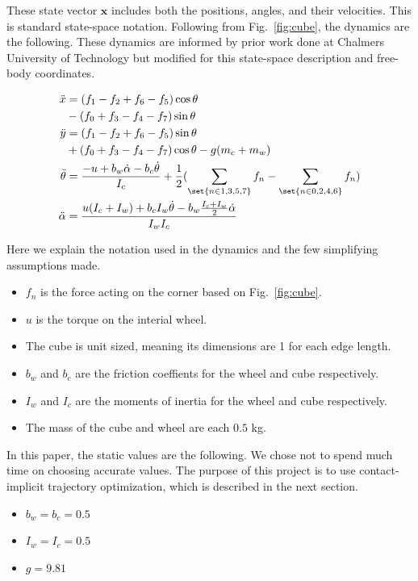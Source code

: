 \documentclass[conference]{IEEEtran}
\begin{document}
These state vector $\textbf{x}$ includes both the positions, angles, and their velocities. This is standard state-space notation. Following from Fig.~\ref{fig:cube}, the dynamics are the following. These dynamics are informed by prior work done at Chalmers University of Technology \cite{b4} but modified for this state-space description and free-body coordinates.

\begin{align}
\ddot x &= (f_{1}-f_{2}+f_{6}-f_{5})\cos{\theta} \\
&- (f_{0}+f_{3}-f_{4}-f_{7})\sin{\theta} \\
\ddot y &= (f_{1}-f_{2}+f_{6}-f_{5})\sin{\theta} \\
&+ (f_{0}+f_{3}-f_{4}-f_{7})\cos{\theta}-g(m_{c}+m_{w}) \\
\ddot \theta &= \frac{-u + b_{w}\dot\alpha - b_{c}\dot\theta}{I_c} + \frac{1}{2}(\sum_{\set{n\in{1,3,5,7}}} f_{n} - \sum_{\set{n\in{0,2,4,6}}} f_{n}) \\
\ddot \alpha &= \frac{u(I_{c}+I_{w}) + b_{c}I_{w}\dot\theta - b_{w}\frac{I_{c}+I_{w}}{2}\dot\alpha}{I_{w}I_{c}}
\end{align}

Here we explain the notation used in the dynamics and the few simplifying assumptions made.

\begin{itemize}
\item $f_{n}$ is the force acting on the corner based on Fig.~\ref{fig:cube}.
\item $u$ is the torque on the interial wheel.
\item The cube is unit sized, meaning its dimensions are 1 for each edge length.
\item $b_{w}$ and $b_{c}$ are the friction coeffients for the wheel and cube respectively.
\item $I_{w}$ and $I_{c}$ are the moments of inertia for the wheel and cube respectively.
\item The mass of the cube and wheel are each $0.5$ kg.
\end{itemize}

In this paper, the static values are the following. We chose not to spend much time on choosing accurate values. The purpose of this project is to use contact-implicit trajectory optimization, which is described in the next section.

\begin{itemize}
\item $b_{w} = b_{c} = 0.5$
\item $I_{w} = I_{c} = 0.5$
\item $g = 9.81$
\end{itemize}
\end{document}
